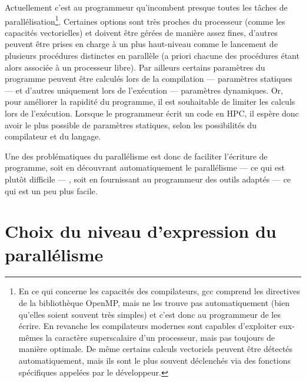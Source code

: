 Actuellement c'est au programmeur qu'incombent presque toutes les tâches de parallélisation\footnote{En ce qui concerne les capacités des compilateurs, \textsf{gcc} comprend les directives de la bibliothèque \textsf{OpenMP}, mais ne les trouve pas automatiquement (bien qu'elles soient souvent très simples) et c'est donc au programmeur de les écrire. En revanche les compilateurs modernes sont capables d'exploiter eux-mêmes la caractère superscalaire d'un processeur, mais pas toujours de manière optimale. De même certains calculs vectoriels peuvent être détectés automatiquement, mais ils sont le plus souvent déclenchés via des fonctions spécifiques appelées par le développeur.}. %
Certaines options sont très proches du processeur (comme les capacités vectorielles) et doivent être gérées de manière assez fines, d'autres peuvent être prises en charge à un plus haut-niveau comme le lancement de plusieurs procédures distinctes en parallèle (a priori chacune des procédures étant alors associée à un processeur libre). %
Par ailleurs certains paramètres du programme peuvent être calculés lors de la compilation --- paramètres statiques --- et d'autres uniquement lors de l'exécution --- paramètres dynamiques. Or, pour améliorer la rapidité du programme, il est souhaitable de limiter les calculs lors de l'exécution. Lorsque le programmeur écrit un code en HPC, il espère donc avoir le plus possible de paramètres statiques, selon les possibilités du compilateur et du langage. 

Une des problématiques du parallélisme est donc de faciliter l'écriture de programme, soit en découvrant automatiquement le parallélisme --- ce qui est plutôt difficile --- , soit en fournissant au programmeur des outils adaptés --- ce qui est un peu plus facile.

\section{Choix du niveau d'expression du parallélisme}


